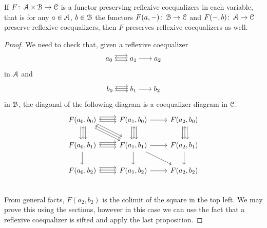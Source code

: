 \documentclass[a4paper,11pt,oneside,openany]{scrbook}
\begin{document}
\begin{prop}
	If $F\colon\operatorname{\mathcal{A}}\times\operatorname{\mathcal{B}}\rightarrow\operatorname{\mathcal{C}}$ is a functor preserving reflexive coequalizers in each variable, that is for any $a\in\operatorname{\mathcal{A}}$, $b\in\operatorname{\mathcal{B}}$ the functors $F(a,-)\colon\operatorname{\mathcal{B}}\rightarrow\operatorname{\mathcal{C}}$ and $F(-,b)\colon\operatorname{\mathcal{A}}\rightarrow\operatorname{\mathcal{C}}$ preserve reflexive coequalizers, then $F$ preserves reflexive coequalizers as well.
\end{prop}

\begin{proof}
	We need to check that, given a reflexive coequalizer$$\hspace{-1.5mm}\begin{tikzcd}
			a_0\hspace{-1.5mm}\arrow[r, shift right=.5ex, shorten <= .3em, shorten >= .3em]  \arrow[r, shift left=1ex, shorten <= .3em, shorten >= .3em] & \hspace{-1.5mm}a_1\hspace{-1.5mm}\arrow[l, shift right=.25ex, shorten <=.3em, shorten >=.3em]\arrow[r, shorten <= .3em, shorten >= .3em] & \hspace{-1.5mm}a_2
		\end{tikzcd}\hspace{-1.5mm}$$in $\operatorname{\mathcal{A}}$ and$$\hspace{-1.5mm}\begin{tikzcd}
			b_0\hspace{-1.5mm}\arrow[r, shift right=.5ex, shorten <= .3em, shorten >= .3em]  \arrow[r, shift left=1ex, shorten <= .3em, shorten >= .3em] & \hspace{-1.5mm}b_1\hspace{-1.5mm}\arrow[l, shift right=.25ex, shorten <=.3em, shorten >=.3em]\arrow[r, shorten <= .3em, shorten >= .3em] & \hspace{-1.5mm}b_2
		\end{tikzcd}\hspace{-1.5mm}$$in $\operatorname{\mathcal{B}}$, the diagonal of the following diagram is a coequalizer diagram in $\operatorname{\mathcal{C}}$.
	\[
		\begin{tikzcd}
			F(a_0,b_0)\ar[r, shift right=.5ex]\ar[r, shift left=1ex]\ar[d, shift right=.5ex]\ar[d, shift left=1ex]\ar[dr, shift right=.5ex]\ar[dr, shift left=1ex]
			& F(a_1,b_0)\ar[d, shift right=.5ex]\ar[d, shift left=1ex]\ar[l, shift right=.25ex]\ar[r]
			& F(a_2,b_0)\ar[d, shift right=.5ex]\ar[d, shift left=1ex] \\
			F(a_0,b_1)\ar[r, shift right=.5ex]\ar[r, shift left=1ex]\ar[u, shift right=.25ex]\ar[d]
			& F(a_1,b_1)\ar[u, shift right=.25ex]\ar[l, shift right=.25ex]\ar[ul, shift right=.25ex]\ar[r]\ar[d]\ar[dr]
			& F(a_2,b_1)\ar[u, shift right=.25ex]\ar[d] \\
			F(a_0,b_2)\ar[r, shift right=.5ex]\ar[r, shift left=1ex]
			& F(a_1,b_2)\ar[l, shift right=.25ex]\ar[r]
			& F(a_2,b_2) \\
		\end{tikzcd}
	\]
	From general facts, $F(a_2,b_2)$ is the colimit of the square in the top
	left. We may prove this using the sections, however in this case we can use
	the fact that a reflexive coequalizer is sifted and apply the last
	proposition.
\end{proof}
\end{document}
